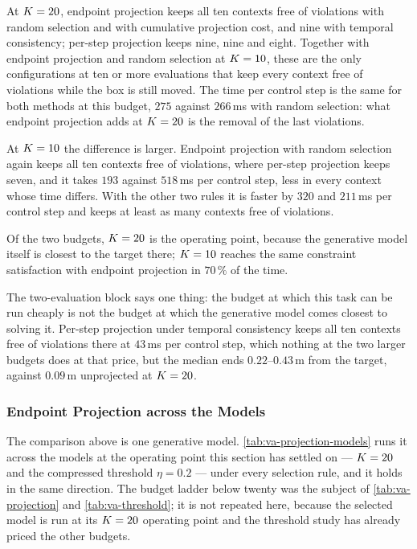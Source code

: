 At $K=20$, endpoint projection keeps all ten contexts free of violations with random selection and
with cumulative projection cost, and nine with temporal consistency; per-step projection keeps nine, nine
and eight. Together with endpoint projection and random selection at $K=10$, these are the only
configurations at ten or more evaluations that keep every context free of violations while the box is
still moved.
The time per control step is the same for both methods at this budget, $275$ against $266$\,ms with random
selection: what endpoint projection adds at $K=20$ is the removal of the last violations.

At $K=10$ the difference is larger. Endpoint projection with random selection again keeps all ten
contexts free of violations, where per-step projection keeps seven, and it takes $193$ against $518$\,ms
per control step, less in every context whose time differs. With the other two rules it is faster by
$320$ and $211$\,ms per control step and keeps at least as many contexts free of violations.

Of the two budgets, $K=20$ is the operating point, because the generative model itself is closest to
the target there; $K=10$ reaches the same constraint satisfaction with endpoint projection in
$70\,\%$ of the time.

The two-evaluation block says one thing: the budget at which this task can be run cheaply is not the
budget at which the generative model comes closest to solving it. Per-step projection under temporal consistency keeps all
ten contexts free of violations there at $43$\,ms per control step, which nothing at the two larger
budgets does at that price, but the median ends $0.22$--$0.43$\,m from the target, against $0.09$\,m
unprojected at $K=20$.

\subsubsection{Endpoint Projection across the Models}\label{sec:res:aligning:projection:models}

The comparison above is one generative model. \autoref{tab:va-projection-models} runs it across the
models at the operating point this section has settled on --- $K=20$ and the compressed threshold
$\eta=0.2$ --- under every selection rule, and it holds in the same direction. The budget ladder below
twenty was the subject of \autoref{tab:va-projection} and \autoref{tab:va-threshold}; it is not repeated
here, because the selected model is run at its $K=20$ operating point and the threshold study has already priced
the other budgets.

